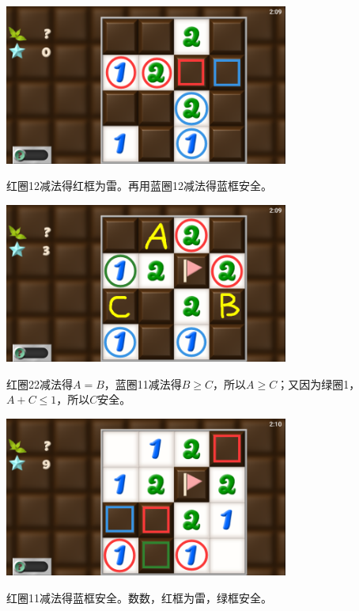 \subsection{} %
\begin{center}
    \includegraphics[width=0.7\textwidth]{puzzle/141-1.png}
\end{center}
红圈12减法得红框为雷。再用蓝圈12减法得蓝框安全。
\begin{center}
    \includegraphics[width=0.7\textwidth]{puzzle/141-2.png}
\end{center}
红圈22减法得$A=B$，蓝圈11减法得$B\ge C$，所以$A\ge C$；又因为绿圈1，$A+C\le 1$，所以$C$安全。
\begin{center}
    \includegraphics[width=0.7\textwidth]{puzzle/141-3.png}
\end{center}
红圈11减法得蓝框安全。数数，红框为雷，绿框安全。


